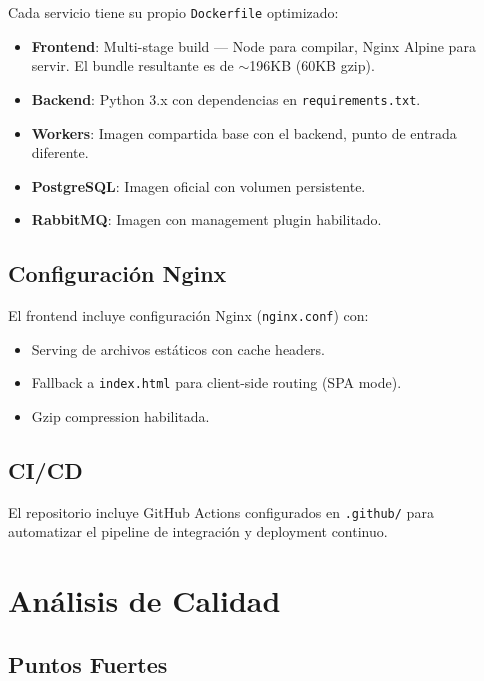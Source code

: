 \documentclass[12pt,a4paper]{article}
\newcommand{\code}[1]{\texttt{\small\color{navy}#1}}
\begin{document}
Cada servicio tiene su propio \code{Dockerfile} optimizado:

\begin{itemize}
  \item \textbf{Frontend}: Multi-stage build — Node para compilar, Nginx Alpine para servir.
        El bundle resultante es de $\sim$196KB (60KB gzip).
  \item \textbf{Backend}: Python 3.x con dependencias en \code{requirements.txt}.
  \item \textbf{Workers}: Imagen compartida base con el backend, punto de entrada diferente.
  \item \textbf{PostgreSQL}: Imagen oficial con volumen persistente.
  \item \textbf{RabbitMQ}: Imagen con management plugin habilitado.
\end{itemize}

\subsection{Configuración Nginx}

El frontend incluye configuración Nginx (\code{nginx.conf}) con:
\begin{itemize}
  \item Serving de archivos estáticos con cache headers.
  \item Fallback a \code{index.html} para client-side routing (SPA mode).
  \item Gzip compression habilitada.
\end{itemize}

\subsection{CI/CD}

El repositorio incluye GitHub Actions configurados en \code{.github/} para
automatizar el pipeline de integración y deployment continuo.

\section{Análisis de Calidad}

\subsection{Puntos Fuertes}
\end{document}
